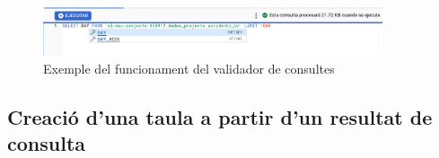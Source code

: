 \documentclass[12pt,longbibliography]{article}
\theoremstyle{definition}
\theoremstyle{remark}
\begin{document}
\vspace{2mm}
\begin{figure}[h!]
\begin{center}
\includegraphics[width=10cm]{bq16}
\end{center}
\caption{Exemple del funcionament del validador de consultes}
\label{fig:bq16}
\end{figure}
\vspace{2mm}

\subsection{Creació d'una taula a partir d'un resultat de consulta}
\end{document}
